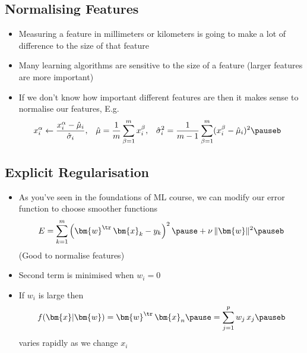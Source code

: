 
\begin{slide}
\section{Normalising Features}

\begin{PauseHighLight}
  \begin{itemize}
  \item Measuring a feature in millimeters or kilometers is going
    to make a lot of difference to the size of that feature\pause
  \item Many learning algorithms are sensitive to the size of a
    feature (larger features are more important)\pause
  \item If we don't know how important different features are then it
    makes sense to normalise our features\pause, E.g.
    \begin{align*}
      x^\alpha_i &\leftarrow \frac{x^\alpha_i-\hat{\mu}_i}{\hat{\sigma}_i},
      &
      \hat{\mu} &= \frac{1}{m} \sum_{\beta=1}^m x_i^\beta,
      &
      \hat{\sigma}_i^2 &= \frac{1}{m-1} \sum_{\beta=1}^m
                       (x_i^\beta-\hat{\mu}_i)^2\pauseb 
    \end{align*}
  \end{itemize}
\end{PauseHighLight}

\end{slide}




\Outline %

\begin{slide}
\section[-2]{Explicit Regularisation}

\begin{PauseHighLight}
  \begin{itemize}
  \item As you've seen in the foundations of ML course, we can modify
    our error function to choose smoother functions
    \begin{align*}
      E = \sum_{k=1}^m \left( \bm{w}^\tr \, \bm{x}_k - y_k \right)^2\pause
      + \nu \, \|\bm{w}\|^2\pauseb
    \end{align*}
    (Good to normalise features)\pauseb
  \item Second term is minimised when $w_i=0$\pause
  \item If $w_i$ is large then
    \begin{align*}
      f(\bm{x}|\bm{w})= \bm{w}^\tr \, \bm{x}_n\pause = \sum_{j=1}^p
      w_j\,x_j\pauseb
    \end{align*}
    varies rapidly as we change $x_i$\pause    
  \end{itemize}
\end{PauseHighLight}

\end{slide}

